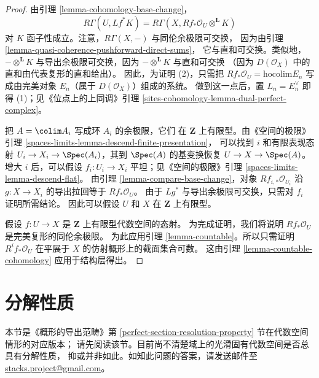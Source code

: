 \begin{proof}
由引理 \ref{lemma-cohomology-base-change}，
$$
R\Gamma(U, Lf^*K) = R\Gamma(X, Rf_*\mathcal{O}_U \otimes^\mathbf{L} K)
$$
对 $K$ 函子性成立。注意，$R\Gamma(X, -)$ 与同伦余极限可交换，
因为由引理 \ref{lemma-quasi-coherence-pushforward-direct-sums}，
它与直和可交换。类似地，$- \otimes^\mathbf{L} K$
与导出余极限可交换，因为 $- \otimes^\mathbf{L} K$ 与直和可交换
（因为 $D(\mathcal{O}_X)$ 中的直和由代表复形的直和给出）。
因此，为证明 (2)，只需把
$Rf_*\mathcal{O}_U = \text{hocolim} E_n$ 写成由完美对象
$E_n$（属于 $D(\mathcal{O}_X)$）组成的系统。
做到这一点后，置 $L_n = E_n^\vee$ 即得 (1)；见《位点上的上同调》引理
\ref{sites-cohomology-lemma-dual-perfect-complex}。

\medskip\noindent
把 $A = \colim A_i$ 写成环 $A_i$ 的余极限，它们
在 $\mathbf{Z}$ 上有限型。由《空间的极限》引理
\ref{spaces-limits-lemma-descend-finite-presentation}，
可以找到 $i$ 和有限表现态射
$U_i \to X_i \to \Spec(A_i)$，其到 $\Spec(A)$ 的基变换恢复
$U \to X \to \Spec(A)$。
增大 $i$ 后，可以假设 $f_i : U_i \to X_i$ 平坦；见《空间的极限》引理
\ref{spaces-limits-lemma-descend-flat}。
由引理 \ref{lemma-compare-base-change}，对象
$Rf_{i, *}\mathcal{O}_{U_i}$ 沿 $g : X \to X_i$ 的导出拉回等于
$Rf_*\mathcal{O}_U$。
由于 $Lg^*$ 与导出余极限可交换，只需对 $f_i$ 证明所需结论。
因此可以假设 $U$ 和 $X$ 在 $\mathbf{Z}$ 上有限型。

\medskip\noindent
假设 $f : U \to X$ 是 $\mathbf{Z}$ 上有限型代数空间的态射。
为完成证明，我们将说明 $Rf_*\mathcal{O}_U$ 是完美复形的同伦余极限。
为此应用引理 \ref{lemma-countable}。所以只需证明
$R^if_*\mathcal{O}_U$ 在平展于 $X$ 的仿射概形上的截面集合可数。
这由引理 \ref{lemma-countable-cohomology} 应用于结构层得出。
\end{proof}









\section{分解性质}
\label{section-resolution-property}

\noindent
本节是《概形的导出范畴》第
\ref{perfect-section-resolution-property} 节在代数空间情形的对应版本；
请先阅读该节。目前尚不清楚域上的光滑固有代数空间是否总具有分解性质，
抑或并非如此。如知此问题的答案，请发送邮件至
\href{mailto:stacks.project@gmail.com}{stacks.project@gmail.com}。

